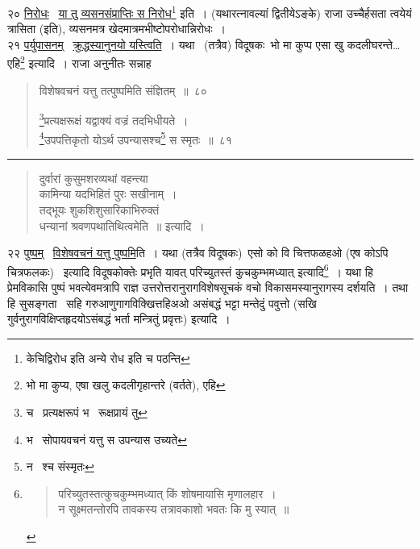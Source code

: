 \documentclass[11pt, openany]{book}
\begin{document}
२० \underline{निरोधः} \textendash\ \underline{या तु व्यसनसंप्राप्तिः स निरोध}\renewcommand{\thefootnote}{$\dagger$}\footnote{केचिद्विरोध इति अन्ये रोध इति च पठन्ति} इति~। (यथारत्नावल्यां द्वितीयेऽङ्के) राजा {\qt उच्चैर्हसता त्वयेयं त्रासिता} (इति), व्यसनमत्र खेदमात्रमभीष्टोपरोधान्निरोधः~।\\

२१ \underline{पर्युपासनम्} \textendash\ \underline{क्रुद्धस्यानुनयो यस्त्विति}~। यथा \textendash\ (तत्रैव) विदूषकः\textendash\ भो मा कुप्प एसा खु कदलीघरन्ते\ldots एहि\renewcommand{\thefootnote}{$\ddagger$}\footnote{भो मा कुप्य, एषा खलु कदलीगृहान्तरे (वर्तते), एहि} इत्यादि~। राजा अनुनीतः सन्नाह \textendash

\newpage

\begin{quote}
{\na विशेषवचनं यत्तु तत्पुष्पमिति संज्ञितम्~॥~८०

\renewcommand{\thefootnote}{1}\footnote{च \textendash\ प्रत्यक्षरूपं भ \textendash\ रूक्षप्रायं तु}प्रत्यक्षरूक्षं यद्वाक्यं वज्रं तदभिधीयते~।\\
\renewcommand{\thefootnote}{2}\footnote{भ \textendash\ सोपायवचनं यत्तु स उपन्यास उच्यते}उपपत्तिकृतो योऽर्थ उपन्यासश्च\renewcommand{\thefootnote}{3}\footnote{न \textendash\ श्च संस्मृतः} स स्मृतः~॥~८१}
\end{quote}

\hrule

\begin{quote}
{\qt दुर्वारां कुसुमशरव्यथां वहन्त्या\\
कामिन्या यदभिहितं पुरः सखीनाम्~।\\
तद्भूयः शुकशिशुसारिकाभिरुक्तं\\
धन्यानां श्रवणपथातिथित्वमेति~॥} इत्यादि~।
\end{quote}

२२ \underline{पुष्पम्} \textendash\ \underline{विशेषवचनं यत्तु पुष्पमि}ति~। यथा (तत्रैव विदूषकः)\textendash\ एसो को वि चित्तफळहओ (एष कोऽपि चित्रफलकः) \textendash\ इत्यादि विदूषकोक्तेः प्रभृति यावत् {\qt परिच्युतस्तं कुचकुम्भमध्यात्} इत्यादि\renewcommand{\thefootnote}{*}\footnote{\begin{quote}
{\qt परिच्युतस्तत्कुचकुम्भमध्यात् किं शोषमायासि मृणालहार~।\\
न सूक्ष्मतन्तोरपि तावकस्य तत्रावकाशो भवतः कि मु स्यात्~॥}
\end{quote}}~। यथा हि प्रेमविकासि पुष्पं भवत्येवमत्रापि राज्ञ उत्तरोत्तरानुरागविशेषसूचकं वचो विकासमस्यानुरागस्य दर्शयति~। तथा हि सुसङ्गता \textendash\ सहि गरुआणुगागविक्खित्तहिअओ असंबद्धं भट्टा मन्तेदुं पवुत्तो (सखि गुर्वनुरागविक्षिप्तहृदयोऽसंबद्धं भर्ता मन्त्रितुं प्रवृत्तः) इत्यादि~।\\
\end{document}
